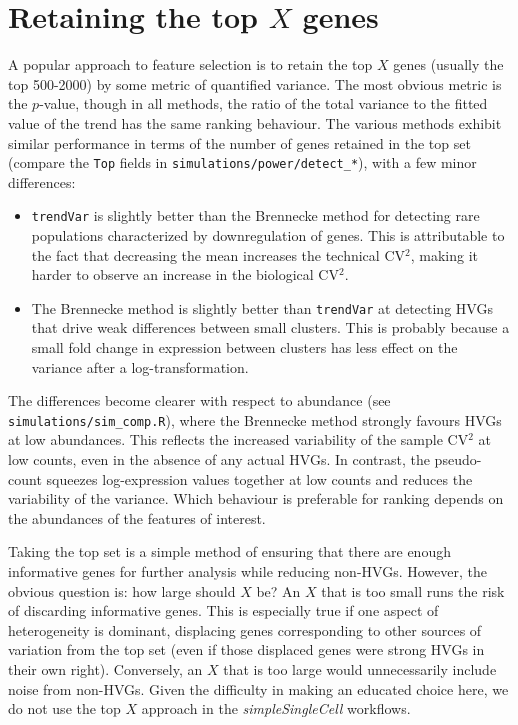 \documentclass{article}
\newcommand\code[1]{{\small\texttt{#1}}}
\begin{document}
\section{Retaining the top $X$ genes}
A popular approach to feature selection is to retain the top $X$ genes (usually the top 500-2000) by some metric of quantified variance.
The most obvious metric is the $p$-value, though in all methods, the ratio of the total variance to the fitted value of the trend has the same ranking behaviour.
The various methods exhibit similar performance in terms of the number of genes retained in the top set
(compare the \code{Top} fields in \texttt{simulations/power/detect\_*}), with a few minor differences:
\begin{itemize}
\item \code{trendVar} is slightly better than the Brennecke method for detecting rare populations characterized by downregulation of genes.
This is attributable to the fact that decreasing the mean increases the technical CV$^2$, making it harder to observe an increase in the biological CV$^2$.
\item The Brennecke method is slightly better than \code{trendVar} at detecting HVGs that drive weak differences between small clusters.
This is probably because a small fold change in expression between clusters has less effect on the variance after a log-transformation.
\end{itemize}
The differences become clearer with respect to abundance (see \texttt{simulations/sim\_comp.R}), where the Brennecke method strongly favours HVGs at low abundances.
This reflects the increased variability of the sample CV$^2$ at low counts, even in the absence of any actual HVGs.
In contrast, the pseudo-count squeezes log-expression values together at low counts and reduces the variability of the variance.
Which behaviour is preferable for ranking depends on the abundances of the features of interest.

Taking the top set is a simple method of ensuring that there are enough informative genes for further analysis while reducing non-HVGs.
However, the obvious question is: how large should $X$ be?
An $X$ that is too small runs the risk of discarding informative genes.
This is especially true if one aspect of heterogeneity is dominant, displacing genes corresponding to other sources of variation from the top set
(even if those displaced genes were strong HVGs in their own right).
Conversely, an $X$ that is too large would unnecessarily include noise from non-HVGs.
Given the difficulty in making an educated choice here, we do not use the top $X$ approach in the \textit{simpleSingleCell} workflows.
\end{document}
